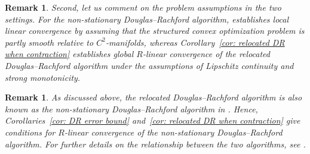 \documentclass[a4paper,12pt]{article}
\newtheorem{remark}[theorem]{Remark}
\begin{document}
\begin{remark}
Second, let us comment on the problem assumptions in the two settings. For the non-stationary Douglas--Rachford algorithm, \cite[Theorem~6.1]{liang2017local} establishes local linear convergence by assuming that the structured convex optimization problem is \emph{partly smooth} relative to $C^2$-manifolds, whereas Corollary~\ref{cor: relocated DR when contraction} establishes global $R$-linear convergence of the relocated Douglas--Rachford algorithm under the assumptions of Lipschitz continuity and strong monotonicity.

\end{remark}

\begin{remark}\label{linear convergence of NDR}
    As discussed above, the relocated Douglas--Rachford algorithm is also known as the non-stationary Douglas--Rachford algorithm in \cite{lorenz2019non}. Hence, Corollaries~\ref{cor: DR error bound} and~\ref{cor: relocated DR when contraction} give conditions for $R$-linear convergence of the non-stationary Douglas--Rachford algorithm.  For further details on the relationship between the two algorithms, see \cite[Remark 4.12]{atenas2025relocated}.
\end{remark}
\end{document}
